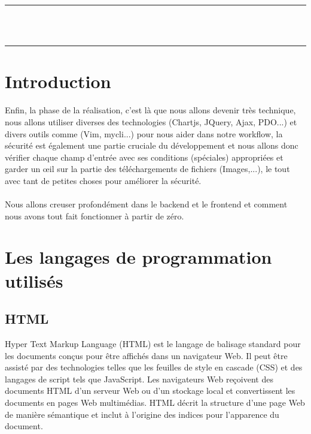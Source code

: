 \documentclass[12pt]{report}
\begin{document}
\newpage

\vspace*{\fill}
\begin{center}
    {\color{Blue} \rule{\linewidth}{1.2mm} }\\
\vspace{0.25in}
    {\centering{}}
\vspace{0.35in}\\
    {\color{Blue} \rule{\linewidth}{1.2mm} }
\end{center}
\vspace*{\fill}
\setcounter{section}{0}

\newpage

\section{Introduction}

Enfin, la phase de la réalisation, c'est là que nous allons devenir très technique, nous allons utiliser diverses des technologies (Chartjs, JQuery, Ajax, PDO...) et divers outils comme (Vim, mycli...) pour nous aider dans notre workflow, la sécurité est également une partie cruciale du développement et nous allons donc vérifier chaque champ d'entrée avec ses conditions (spéciales) appropriées et garder un œil sur la partie des téléchargements de fichiers (Images,...), le tout avec tant de petites choses pour améliorer la sécurité.
\\\\
Nous allons creuser profondément dans le backend et le frontend et comment nous avons tout fait fonctionner à partir de zéro.

\section{Les langages de programmation utilisés}

\subsection{HTML}

Hyper Text Markup Language (HTML) est le langage de balisage standard pour les documents conçus pour être affichés dans un navigateur Web. Il peut être assisté par des technologies telles que les feuilles de style en cascade (CSS) et des langages de script tels que JavaScript.
Les navigateurs Web reçoivent des documents HTML d'un serveur Web ou d'un stockage local et convertissent les documents en pages Web multimédias. HTML décrit la structure d'une page Web de manière sémantique et inclut à l'origine des indices pour l'apparence du document.
\end{document}
